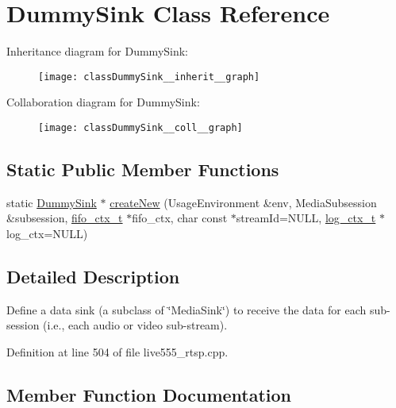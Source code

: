 \hypertarget{classDummySink}{}\section{Dummy\+Sink Class Reference}
\label{classDummySink}


Inheritance diagram for Dummy\+Sink\+:\nopagebreak
\begin{figure}[H]
\begin{center}
\leavevmode
\texttt{[image: classDummySink\_\_inherit\_\_graph]}
\end{center}
\end{figure}


Collaboration diagram for Dummy\+Sink\+:\nopagebreak
\begin{figure}[H]
\begin{center}
\leavevmode
\texttt{[image: classDummySink\_\_coll\_\_graph]}
\end{center}
\end{figure}
\subsection*{Static Public Member Functions}
\begin{DoxyCompactItemize}
\item 
static \hyperlink{classDummySink}{Dummy\+Sink} $\ast$ \hyperlink{classDummySink_af1d373302d3f27791ac565136321765b}{create\+New} (Usage\+Environment \&env, Media\+Subsession \&subsession, \hyperlink{fifo_8c_acf3f21e64cbabccd8420c306740820c1}{fifo\+\_\+ctx\+\_\+t} $\ast$fifo\+\_\+ctx, char const $\ast$stream\+Id=N\+U\+LL, \hyperlink{structlog__ctx__s}{log\+\_\+ctx\+\_\+t} $\ast$log\+\_\+ctx=N\+U\+LL)
\end{DoxyCompactItemize}


\subsection{Detailed Description}
Define a data sink (a subclass of \char`\"{}\+Media\+Sink\char`\"{}) to receive the data for each sub-\/session (i.\+e., each audio or video \textquotesingle{}sub-\/stream\textquotesingle{}). 

Definition at line 504 of file live555\+\_\+rtsp.\+cpp.



\subsection{Member Function Documentation}
